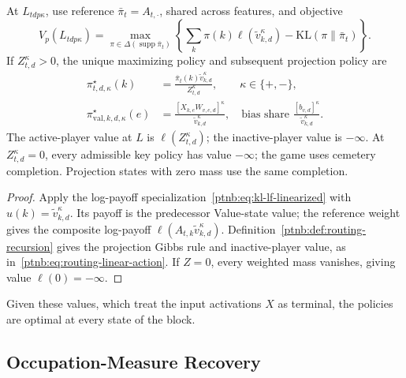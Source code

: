 \begin{proposition}\label{ptnb:prop:attn-value-policy}
At $L_{tdp\kappa}$, use reference $\bar\pi_t=A_{t,\cdot}$, shared across features, and objective
\begin{equation}\label{ptnb:eq:attn-value-routing}
    V_p(L_{tdp\kappa})=
    \max_{\pi\in\Delta(\operatorname{supp}\bar\pi_t)}
      \left\{\sum_k\pi(k)\ell(\tilde v_{k,d}^\kappa)
      -\mathrm{KL}(\pi\|\bar\pi_t)\right\}.
\end{equation}
If $Z_{t,d}^\kappa>0$, the unique maximizing policy and subsequent projection policy are
\begin{align}
    \pi_{t,d,\kappa}^\star(k)
      &=\frac{\bar\pi_t(k)\tilde v_{k,d}^\kappa}{Z_{t,d}^\kappa},
      \qquad \kappa\in\{+,-\},\label{ptnb:eq:attn-value-policy}\\
    \pi_{\mathrm{val},k,d,\kappa}^\star(e)
      &=\frac{[X_{k,e}W_{v,e,d}]^\kappa}{\tilde v_{k,d}^\kappa},
      \quad\text{bias share }\frac{[b_{v,d}]^\kappa}{\tilde v_{k,d}^\kappa}.
      \label{ptnb:eq:attn-V-routing-policy}
\end{align}
The active-player value at $L$ is $\ell(Z_{t,d}^\kappa)$; the inactive-player value is $-\infty$. At $Z_{t,d}^\kappa=0$, every admissible key policy has value $-\infty$; the game uses cemetery completion. Projection states with zero mass use the same completion.
\end{proposition}
\begin{proof}
Apply the log-payoff specialization~\eqref{ptnb:eq:kl-lf-linearized} with $u(k)=\tilde v_{k,d}^\kappa$. Its payoff is the predecessor Value-state value; the reference weight gives the composite log-payoff $\ell(A_{t,k}\tilde v_{k,d}^\kappa)$. Definition~\ref{ptnb:def:routing-recursion} gives the projection Gibbs rule and inactive-player value, as in~\eqref{ptnb:eq:routing-linear-action}. If $Z=0$, every weighted mass vanishes, giving value $\ell(0)=-\infty$.
\end{proof}
Given these values, which treat the input activations $X$ as terminal, the policies are optimal at every state of the block.

\subsection{Occupation-Measure Recovery}\label{ptnb:app:attention-recovery}

